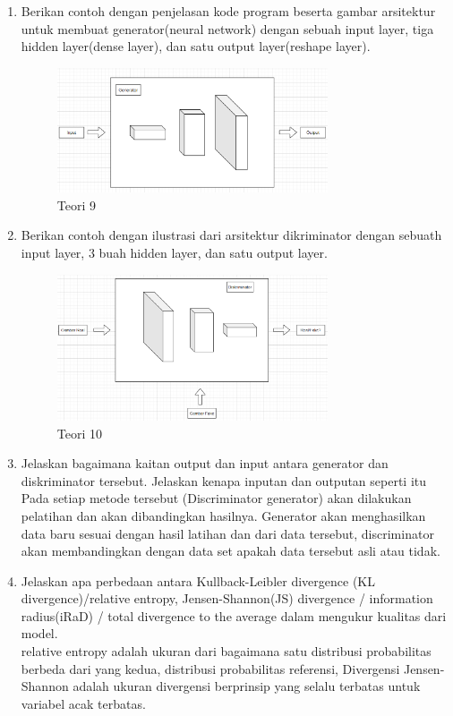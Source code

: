 \begin{enumerate}
\item Berikan contoh dengan penjelasan kode program beserta gambar arsitektur untuk membuat generator(neural network) dengan sebuah input layer, tiga hidden layer(dense layer), dan satu output layer(reshape layer).
	\hfill\\
	
	
\begin{figure}[H]
    \includegraphics[width=8cm]{figures/1174084/8/teori9.png}
    \centering
    \caption{Teori 9}
\end{figure}


\item Berikan contoh dengan ilustrasi dari arsitektur dikriminator dengan sebuath input layer, 3 buah hidden layer, dan satu output layer.
	\hfill\\

\begin{figure}[H]
    \includegraphics[width=8cm]{figures/1174084/8/teori10.png}
    \centering
    \caption{Teori 10}
\end{figure}		
	

\item Jelaskan bagaimana kaitan output dan input antara generator dan diskriminator tersebut. Jelaskan kenapa inputan dan outputan seperti itu
	\hfill\\
	Pada setiap metode tersebut (Discriminator generator) akan dilakukan pelatihan dan akan dibandingkan hasilnya. Generator akan menghasilkan data baru sesuai dengan hasil latihan dan dari data tersebut, discriminator akan membandingkan dengan data set apakah data tersebut asli atau tidak.
	

\item Jelaskan apa perbedaan antara Kullback-Leibler divergence (KL divergence)/relative entropy, Jensen-Shannon(JS) divergence / information radius(iRaD) / total divergence to the average dalam mengukur kualitas dari model.
	\hfill\\
	relative entropy adalah ukuran dari bagaimana satu distribusi probabilitas berbeda dari yang kedua, distribusi probabilitas referensi, Divergensi Jensen-Shannon adalah ukuran divergensi berprinsip yang selalu terbatas untuk variabel acak terbatas.



\end{enumerate}
